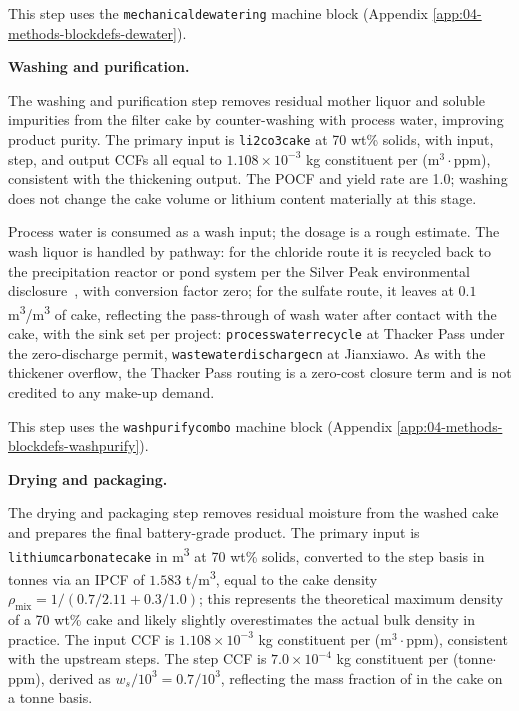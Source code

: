\documentclass{article}
\renewcommand\_{\textunderscore\allowbreak}
\begin{document}
This step uses the \texttt{mechanical\_dewatering} machine block (Appendix \ref{app:04-methods-blockdefs-dewater}).

\medskip
\noindent\textbf{Washing and purification.}\quad

The washing and purification step removes residual mother liquor and soluble impurities from the  filter cake by counter-washing with process water, improving product purity. The primary input is \texttt{li2co3\_cake} at 70 wt\% solids, with input, step, and output CCFs all equal to $1.108 \times 10^{-3}$ kg constituent per (m$^3 \cdot$ppm), consistent with the thickening output. The POCF and yield rate are 1.0; washing does not change the cake volume or lithium content materially at this stage.
 
Process water is consumed as a wash input; the dosage is a rough estimate. The wash liquor is handled by pathway: for the chloride route it is recycled back to the precipitation reactor or pond system per the Silver Peak environmental disclosure~\cite{srkconsultingSECTechnicalReport2023a}, with conversion factor zero; for the sulfate route, it leaves at $0.1$ \si{m^3/m^3} of cake, reflecting the pass-through of wash water after contact with the cake, with the sink set per project: \texttt{process\_water\_recycle} at Thacker Pass under the zero-discharge permit, \texttt{wastewater\_discharge\_cn} at Jianxiawo. As with the thickener overflow, the Thacker Pass routing is a zero-cost closure term and is not credited to any make-up demand.

This step uses the \texttt{wash\_purify\_combo} machine block (Appendix \ref{app:04-methods-blockdefs-washpurify}).

 
\medskip
\noindent\textbf{Drying and packaging.}\quad

The drying and packaging step removes residual moisture from the washed  cake and prepares the final battery-grade product. The primary input is \texttt{lithium\_carbonate\_cake} in \si{m^3} at 70 wt\% solids, converted to the step basis in tonnes via an IPCF of $1.583$ \si{t/m^3}, equal to the cake density $\rho_\text{mix} = 1/(0.7/2.11 + 0.3/1.0)$; this represents the theoretical maximum density of a 70 wt\%  cake and likely slightly overestimates the actual bulk density in practice. The input CCF is $1.108 \times 10^{-3}$ kg constituent per (m$^3 \cdot$ppm), consistent with the upstream steps. The step CCF is $7.0 \times 10^{-4}$ kg constituent per (tonne$\cdot$ppm), derived as $w_s / 10^3 = 0.7 / 10^3$, reflecting the mass fraction of  in the cake on a tonne basis.
 
\end{document}
